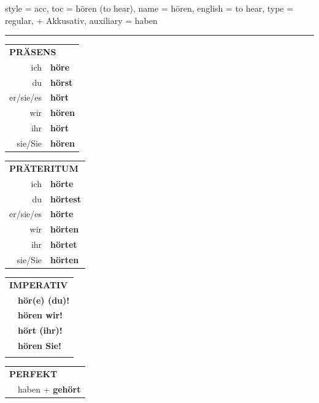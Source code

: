 \begin{verbentry}{
  style = {acc},
  toc = {hören (to hear)},
  name = {hören},
  english = {to hear},
  type = {regular, + Akkusativ},
  auxiliary = {haben}
}
 
    
     \vspace{5pt}

    \hrule
    
    \vspace{5pt}

  \begin{tabular}{rl}
     \multicolumn{2}{l}{\textbf{PRÄSENS} }\\
    ich & \textbf{höre}\\
    du & \textbf{hörst}\\
    er/sie/es & \textbf{hört}\\
    wir & \textbf{hören}\\
    ihr & \textbf{hört}\\
    sie/Sie & \textbf{hören}\\
  \end{tabular}
  \hfill
     \begin{tabular}{rl}
    \multicolumn{2}{l}{\textbf{PRÄTERITUM} }\\
    ich & \textbf{hörte}\\
    du & \textbf{hörtest}\\
    er/sie/es & \textbf{hörte}\\
    wir & \textbf{hörten}\\
    ihr & \textbf{hörtet}\\
    sie/Sie & \textbf{hörten}\\
  \end{tabular}
  \hfill
  \begin{tabular}{rl}
     \multicolumn{2}{l}{\textbf{IMPERATIV} }\\
   & \textbf{hör(e) (du)!}\\
   & \textbf{hören wir!}\\
   & \textbf{hört (ihr)!}\\
   & \textbf{hören Sie!}\\
   & \vspace{10pt}
  \end{tabular}

    \vspace{10pt}

 \begin{tabular}{rl}
     \multicolumn{2}{l}{\textbf{PERFEKT}}\\
    &haben + \textbf{gehört}\\
  \end{tabular}
\hfill
   \begin{tabular}{rl}
   

\end{tabular}
\end{verbentry}
